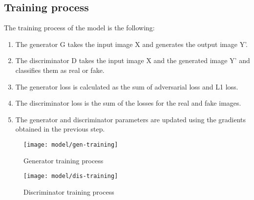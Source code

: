 \subsection{Training process}
\label{subsec:training-process}
The training process of the model is the following:
\begin{enumerate}
    \item The generator G takes the input image X and generates the output image Y'.
    \item The discriminator D takes the input image X and the generated image Y' and
    classifies them as real or fake.
    \item The generator loss is calculated as the sum of adversarial loss and L1 loss.
    \item The discriminator loss is the sum of the losses for the real and fake images.
    \item The generator and discriminator parameters are updated using the gradients
    obtained in the previous step.
\end{enumerate}
\begin{figure}[H]
    \centering
    \texttt{[image: model/gen-training]}
    \caption{Generator training process}
    \label{fig:gen-training}
    \texttt{[image: model/dis-training]}
    \caption{Discriminator training process}
    \label{fig:dis-training}
\end{figure}
